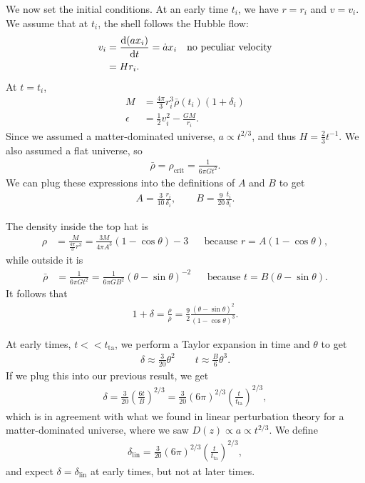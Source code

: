 We now set the initial conditions.
At an early time $t_i$, we have $r=r_i$ and $v = v_i$. We assume that at $t_i$, the shell follows the Hubble flow:
\begin{align*}
	v_i
	&= \dv{(a x_i)}{t} 
	= \dot{a} x_i &&\text{no peculiar velocity}\\
	&= H r_i.
\end{align*}
At $t=t_i$,
\begin{align*}
	M
	&= \frac{4\pi}{3} r_i^3 \bar{\rho}(t_i)(1+\delta_i)\\
	\epsilon
	&= \frac{1}{2} v_i^2 - \frac{GM}{r_i}.
\end{align*}
Since we assumed a matter-dominated universe, $a \propto t^{2/3}$, and thus $H = \frac{2}{3} t^{-1}$. We also assumed a flat universe, so
\begin{align*}
	\bar{\rho}
	= \rho_\text{crit}
	= \frac{1}{6\pi G t^2}.
\end{align*}
We can plug these expressions into the definitions of $A$ and $B$ to get
\begin{align*}
	A = \frac{3}{10} \frac{r_i}{\delta_i},
	\qquad
	B = \frac{9}{20} \frac{t_i}{\delta_i}.
\end{align*}

The density inside the top hat is
\begin{align*}
	\rho
	&= \frac{M}{\frac{4\pi}{3}r^3}
	= \frac{3M}{4\pi A^3} (1-\cos\theta)-3
	&&\text{because } r = A(1-\cos\theta),
\end{align*}
while outside it is
\begin{align*}
	\bar{\rho}
	&= \frac{1}{6\pi G t^2}
	= \frac{1}{6 \pi G B^2} (\theta-\sin\theta)^{-2}
	&& \text{because } t = B(\theta - \sin\theta).
\end{align*}
It follows that
\begin{align*}
	1 + \delta
	= \frac{\rho}{\bar{\rho}}
	= \frac{9}{2} \frac{(\theta-\sin\theta)^{2}}{(1-\cos\theta)^3}.
\end{align*}

At early times, $t << t_\text{ta}$, we perform a Taylor expansion in time and $\theta$ to get
\begin{align*}
	\delta \approx \frac{3}{20} \theta^2
	\qquad
	t \approx \frac{B}{6} \theta^3.
\end{align*}
If we plug this into our previous result, we get
\begin{align*}
	\delta
	= \frac{3}{20} \left( \frac{6 t}{B} \right)^{2/3}
	= \frac{3}{20} (6\pi)^{2/3} \left( \frac{t}{t_\text{ta}} \right)^{2/3},
\end{align*}
which is in agreement with what we found in linear perturbation theory for a matter-dominated universe, where we saw $D(z) \propto a \propto t^{2/3}$.
We define
\begin{align*}
	\delta_\text{lin} = \frac{3}{20} (6\pi)^{2/3} \left( \frac{t}{t_\text{ta}} \right)^{2/3},
\end{align*}
and expect $\delta = \delta_\text{lin}$ at early times, but not at later times.

